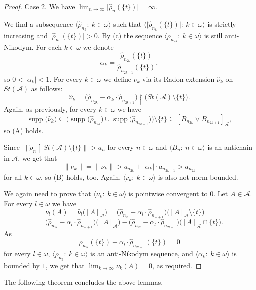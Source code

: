 \documentclass[a4paper,11pt,fleqn]{amsart}
\theoremstyle{definition}
\theoremstyle{remark}
\numberwithin{equation}{section}
\newcommand{\N}{\mathbb{N}}
\newcommand{\aA}{\mathcal{A}}
\newcommand{\rstr}{\restriction}
\newcommand{\sm}{\setminus}
\newcommand{\sub}{\subseteq}
\DeclareMathOperator{\supp}{supp}
\newcommand{\wh}{\widehat}
\newcommand{\seqn}[1]{\big\langle#1\colon\ n\io\big\rangle}
\newcommand{\seqk}[1]{\big\langle#1\colon\ k\io\big\rangle}
\newcommand{\clopen}[1]{\left[#1\right]}
\newcommand{\io}{\in\omega}%
\begin{document}
\begin{proof}

\medskip

\underline{Case 2.} We have $\lim_{n\to\infty} \big| \wh{\rho}_n(\{t\}) \big| = \infty$.

We find a subsequence $\seqk{\wh{\rho}_{n_k}}$ such that $\seqk{\big| \wh{\rho}_{n_k}(\{t\}) \big| }$ is strictly increasing and $\big| \wh{\rho}_{n_0}(\{t\}) \big|>0$. By (c) the sequence $\seqk{\rho_{n_{2k}}}$ is still anti-Nikodym. For each $k\io$ we denote
\[ \alpha_k = \frac{\wh{\rho}_{n_{2k}}(\{t\})} {\wh{\rho}_{n_{2k+1}}(\{t\})},\]
so $0<|\alpha_k|<1$. For every $k\io$ we define $\nu_k$ via its Radon extension $\wh{\nu}_k$ on $St(\aA)$ as follows:
\[\wh{\nu}_k= \big( \wh{\rho}_{n_{2k}} - \alpha_k\cdot \wh{\rho}_{n_{2k+1}} \big) \rstr\big(St(\aA) \sm \{t\}\big).\]
Again, as previously, for every $k\io$ we have
\[ \supp\big(\wh{\nu}_k\big)\sub \big(\supp\big(\wh{\rho}_{n_{2k}}\big)\cup \supp\big(\wh{\rho}_{n_{2k+1}}\big) \big) \sm \{t\} \sub \clopen{B_{n_{2k}}\vee B_{n_{2k+1}}}_\aA,\]
so (A) holds.

Since $\big\|\wh{\rho}_n\rstr St(\aA)\sm\{t\}\big\|>a_n$ for every $n\io$ and $\seqn{B_n}$ is an antichain in $\aA$, we get that
\[\big\|\nu_k\big\| = \big\|\wh{\nu}_k\big\| > a_{n_{2k}}+ \big|\alpha_k\big|\cdot a_{n_{2k+1}} > a_{n_{2k}}\]
for all $k\io$, so (B) holds, too. Again, $\seqk{\nu_k}$ is also not norm bounded.%

We again need to prove that $\seqk{\nu_k}$ is pointwise convergent to $0$. Let $A\in\aA$. For every $l\io$ we have
\[\nu_l(A)=\wh{\nu}_l \big(\clopen{A}_\aA\big) =
\big( \wh{\rho}_{n_{2l}} - \alpha_l \cdot \wh{\rho}_{n_{2l+1}} \big) \big(\clopen{A}_\aA \sm \{t\} \big) =
\] \[
= \big( \wh{\rho}_{n_{2l}} - \alpha_l \cdot \wh{\rho}_{n_{2l+1}} \big) \big(\clopen{A}_\aA \big) - \big( \wh{\rho}_{n_{2l}} - \alpha_l \cdot \wh{\rho}_{n_{2l+1}} \big) \big(\clopen{A}_\aA \cap \{t\} \big). \]
As
\[\wh{\rho}_{n_{2l}} (\{t\} ) - \alpha_l \cdot \wh{\rho}_{n_{2l+1}} (\{t\} ) = 0\]
for every $l\io$, $\seqk{\rho_{n_k}}$ is an anti-Nikodym sequence, and $\seqk{\alpha_k}$ is bounded by $1$, we get that $\lim_{k\to\infty}\nu_k(A)=0$, as required. 
\end{proof}

The following theorem concludes the above lemmas.
\end{document}
